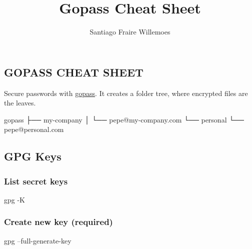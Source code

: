 \documentclass[9pt,english,a4paper,]{scrartcl}
\title{Gopass Cheat Sheet}
\author{Santiago Fraire Willemoes}
\date{}
\newenvironment{Shaded}{}{}
\newcommand{\ExtensionTok}[1]{#1}
\newcommand{\NormalTok}[1]{#1}
\begin{document}
\raggedright

\footnotesize

\begin{multicols}{3}
\hypertarget{gopass-cheat-sheet}{%
\section{GOPASS CHEAT SHEET}\label{gopass-cheat-sheet}}

Secure passwords with \href{https://gopass.pw}{gopass}. It creates a
folder tree, where encrypted files are the leaves.

\begin{Shaded}
\begin{Highlighting}[]
\ExtensionTok{gopass}
\NormalTok{├── }\ExtensionTok{my-company}
\NormalTok{│   └── }\ExtensionTok{pepe@my-company.com}
\NormalTok{└── }\ExtensionTok{personal}
\NormalTok{    └── }\ExtensionTok{pepe@personal.com}
\end{Highlighting}
\end{Shaded}

\hypertarget{gpg-keys}{%
\subsection{GPG Keys}\label{gpg-keys}}

\hypertarget{list-secret-keys}{%
\subsubsection{List secret keys}\label{list-secret-keys}}

\begin{Shaded}
\begin{Highlighting}[]
\ExtensionTok{gpg}\NormalTok{ -K}
\end{Highlighting}
\end{Shaded}

\hypertarget{create-new-key-required}{%
\subsubsection{Create new key
(required)}\label{create-new-key-required}}

\begin{Shaded}
\begin{Highlighting}[]
\ExtensionTok{gpg}\NormalTok{ --full-generate-key}
\end{Highlighting}
\end{Shaded}


\end{multicols}
\end{document}
